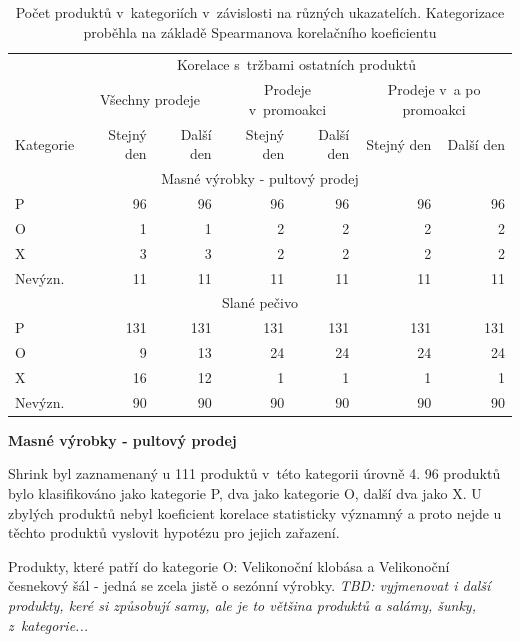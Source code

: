 \begin{table}[hbtp!]
    \centering
    \captionsetup{justification=centering}
    \caption{Počet produktů v~kategoriích v~závislosti na různých ukazatelích. Kategorizace proběhla na základě Spearmanova korelačního koeficientu}
    \begin{tabular}{l *{6}{r}}
    \toprule
    \multicolumn{1}{l}{} & \multicolumn{6}{c}{Korelace s~tržbami ostatních produktů} \\
    \multicolumn{1}{l}{} & \multicolumn{2}{c}{Všechny prodeje} & \multicolumn{2}{c}{Prodeje v~promoakci}  & \multicolumn{2}{c}{Prodeje v~a po promoakci} \\
    Kategorie & Stejný den & Další den & Stejný den & Další den & Stejný den & Další den \\
    \midrule
    \multicolumn{7}{c}{Masné výrobky - pultový prodej} \\
    \midrule
    P           & 96   & 96   & 96   & 96   & 96   & 96   \\
    O           & 1     & 1   & 2   & 2   & 2   & 2   \\
    X           & 3     & 3   & 2   & 2   & 2   & 2   \\
    Nevýzn.     & 11    & 11   & 11   & 11   & 11   & 11   \\
    \midrule
    \multicolumn{7}{c}{Slané pečivo} \\
    \midrule
    P           & 131   & 131   & 131   & 131   & 131   & 131   \\
    O           & 9     & 13   & 24   & 24   & 24   & 24   \\
    X           & 16    & 12   & 1    & 1    & 1    & 1    \\
    Nevýzn.     & 90    & 90   & 90   & 90   & 90   & 90   \\
    \bottomrule

    \end{tabular}
    \label{tab:kategCorrPorovnani}
\end{table}



\textbf{Masné výrobky - pultový prodej}

Shrink byl zaznamenaný u 111 produktů v~této kategorii úrovně 4. 96 produktů bylo klasifikováno jako kategorie P, dva jako kategorie O, další dva jako X. U zbylých produktů nebyl koeficient korelace statisticky významný a proto nejde u těchto produktů vyslovit hypotézu pro jejich zařazení.

Produkty, které patří do kategorie O: Velikonoční klobása a Velikonoční česnekový šál - jedná se zcela jistě o sezónní výrobky. \emph{TBD: vyjmenovat i další produkty, keré si způsobují samy, ale je to většina produktů a salámy, šunky, z~kategorie...} 

